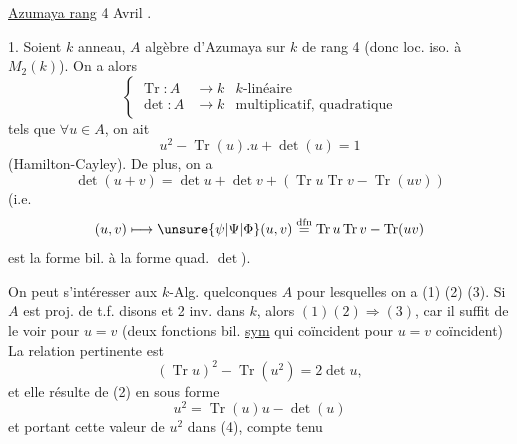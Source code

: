 \uline{Azumaya rang} 4  Avril .

1. Soient $k$ anneau, $A$ algèbre d'Azumaya sur $k$ de rang 4 (donc loc. iso. à $M_2(k)$). On a alors
\[
\left\{\begin{aligned}
\operatorname{Tr}: A&\longrightarrow k & k\text{-linéaire}\\
\det: A&\longrightarrow k & \text{multiplicatif, quadratique}
\end{aligned}\right. \tag*{(1)}
\]
tels que $\forall u\in A$, on ait
\[ u^2-\operatorname{Tr}(u).u+\det(u)=1 \tag*{(2)} \]
(Hamilton-Cayley). De plus, on a
\[ \det(u+v)=\det u+\det v+(\operatorname{Tr}u\operatorname{Tr}v-\operatorname{Tr}(uv)) \tag*{(3)} \]
(i.e.
\[ (u,v)\longmapsto\unsure{\psi|\Psi|\Phi}(u,v)\overset{\text{dfn}}{=}\operatorname{Tr}u\operatorname{Tr}v-\operatorname{Tr}(uv) \]
est la forme bil.  à la forme quad. $\det$).

\uline{} On peut s'intéresser aux $k$-Alg. quelconques $A$ pour lesquelles on a (1) (2) (3). Si $A$ est proj. de t.f. disons et 2 inv. dans $k$, alors $(1)(2)\Longrightarrow(3)$, car il suffit de le voir pour $u=v$ (deux fonctions bil. \uline{sym} qui coïncident pour $u=v$ coïncident)
 La relation pertinente est
\[ (\operatorname{Tr}u)^2-\operatorname{Tr}(u^2)=2\det u, \tag*{(4)} \]
et elle résulte de (2) en  sous forme
\[ u^2=\operatorname{Tr}(u)u-\det(u) \tag*{(2')} \]
et portant cette valeur de $u^2$ dans (4), compte tenu
